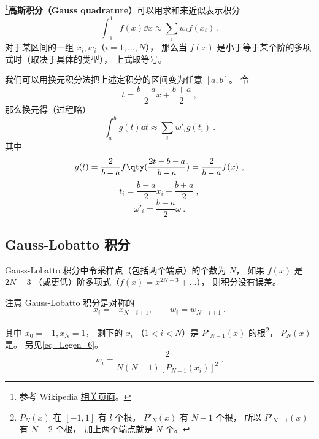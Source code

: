 
\begin{issues}
\issueAbstract
\end{issues}


\footnote{参考 Wikipedia \href{https://en.wikipedia.org/wiki/Gaussian_quadrature}{相关页面}。}\textbf{高斯积分（Gauss quadrature）}可以用求和来近似表示积分
\begin{equation}
\int_{-1}^1 f(x) \dd{x} \approx \sum_i w_i f(x_i)~.
\end{equation}
对于某区间的一组 $x_i, w_i$（$i = 1,\dots,N$）， 那么当 $f(x)$ 是小于等于某个阶的多项式时（取决于具体的类型）， 上式取等号。

我们可以用换元积分法把上述定积分的区间变为任意 $[a,b]$。 令
\begin{equation}
t = \frac{b-a}{2}x + \frac{b+a}{2}~,
\end{equation}
那么换元得（过程略）
\begin{equation}
\int_a^b g(t) \dd{t} \approx \sum_i w'_i g(t_i)~.
\end{equation}
其中
\begin{equation}
g(t) = \frac{2}{b-a} f\qty(\frac{2t - b - a}{b - a}) = \frac{2}{b-a} f(x)~,
\end{equation}
\begin{equation}
t_i = \frac{b-a}{2}x_i + \frac{b+a}{2}~,
\end{equation}
\begin{equation}
\omega'_i = \frac{b-a}{2}\omega~.
\end{equation}


\subsection{Gauss-Lobatto 积分}
Gauss-Lobatto 积分中令采样点（包括两个端点）的个数为 $N$， 如果 $f(x)$ 是 $2N-3$ （或更低）阶多项式（$f(x) = x^{2N-3} + \dots$）， 则积分没有误差。

注意 Gauss-Lobatto 积分是对称的
\begin{equation}\label{eq_GLquad_5}
x_i = -x_{N-i+1}, \qquad w_{i} = w_{N-i+1}~.
\end{equation}

其中 $x_0 = -1, x_N = 1$， 剩下的 $x_i$ （$1 < i < N$）是 $P'_{N-1}(x)$ 的根\footnote{$P_N(x)$ 在 $[-1,1]$ 有 $l$ 个根。 $P'_N(x)$ 有 $N-1$ 个根， 所以 $P'_{N-1}(x)$ 有 $N-2$ 个根， 加上两个端点就是 $N$ 个。}， $P_N(x)$ 是。 另见\autoref{eq_Legen_6}。
\begin{equation} %
w_i = \frac{2}{N(N-1)[P_{N-1}(x_i)]^2}~.
\end{equation}

